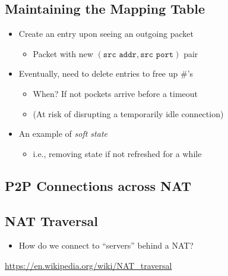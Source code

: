 \subsection{Maintaining the Mapping Table}
\begin{itemize}[nosep]
    \item Create an entry upon seeing an outgoing packet
          \begin{itemize}[nosep]
              \item Packet with new $(\texttt{src addr}, \texttt{src port})$ pair
          \end{itemize}
    \item Eventually, need to delete entries to free up \#'s
          \begin{itemize}[nosep]
              \item When? If not pockets arrive before a timeout
              \item (At risk of disrupting a temporarily idle connection)
          \end{itemize}
    \item An example of \emph{soft state}
          \begin{itemize}[nosep]
              \item i.e., removing state if not refreshed for a while
          \end{itemize}
\end{itemize}

\subsection{P2P Connections across NAT}
\begin{figure}[H]
\end{figure}

\subsection{NAT Traversal}
\begin{itemize}[nosep]
    \item How do we connect to ``servers'' behind a NAT?
\end{itemize}
\url{https://en.wikipedia.org/wiki/NAT_traversal}

